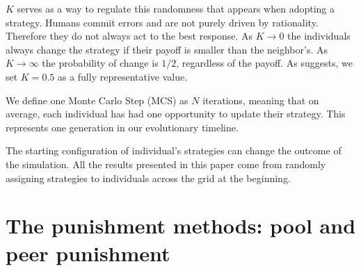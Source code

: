 $K$ serves as a way to regulate this randomness that appears when adopting a strategy. Humans commit errors and are not purely driven by rationality. Therefore they do not always act to the best response. As $K \to 0$ the individuals always change the strategy if their payoff is smaller than the neighbor's. As $K \to \infty$ the probability of change is $1/2$, regardless of the payoff. As \cite{ValorK} suggests, we set $K=0.5$ as a fully representative value.

We define one Monte Carlo Step (MCS) as $N$ iterations, meaning that on average, each individual has had one opportunity to update their strategy. This represents one generation in our evolutionary timeline. 

The starting configuration of individual's strategies can change the outcome of the simulation. All the results presented in this paper come from randomly assigning strategies to individuals across the grid at the beginning. 




\section{The punishment methods: pool and peer punishment}
\label{3punish}



